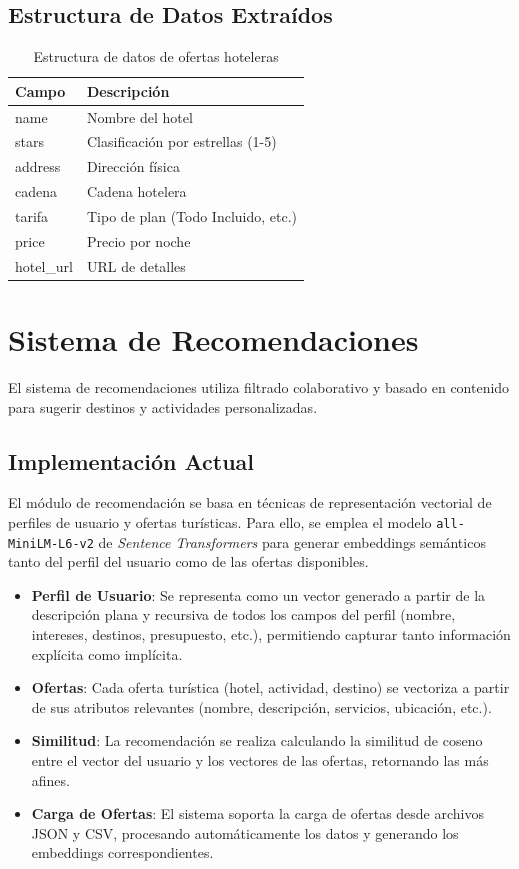 \documentclass[runningheads]{llncs}
\begin{document}
\subsection{Estructura de Datos Extraídos}

\begin{table}[H]
\centering
\begin{tabular}{ll}
\toprule
\textbf{Campo} & \textbf{Descripción} \\
\midrule
name & Nombre del hotel \\
stars & Clasificación por estrellas (1-5) \\
address & Dirección física \\
cadena & Cadena hotelera \\
tarifa & Tipo de plan (Todo Incluido, etc.) \\
price & Precio por noche \\
hotel\_url & URL de detalles \\
\bottomrule
\end{tabular}
\caption{Estructura de datos de ofertas hoteleras}
\end{table}

\section{Sistema de Recomendaciones}


El sistema de recomendaciones utiliza filtrado colaborativo y basado en contenido para sugerir destinos y actividades personalizadas.

\subsection{Implementación Actual}

El módulo de recomendación se basa en técnicas de representación vectorial de perfiles de usuario y ofertas turísticas. Para ello, se emplea el modelo \texttt{all-MiniLM-L6-v2} de \textit{Sentence Transformers} para generar embeddings semánticos tanto del perfil del usuario como de las ofertas disponibles.

\begin{itemize}
    \item \textbf{Perfil de Usuario}: Se representa como un vector generado a partir de la descripción plana y recursiva de todos los campos del perfil (nombre, intereses, destinos, presupuesto, etc.), permitiendo capturar tanto información explícita como implícita.
    \item \textbf{Ofertas}: Cada oferta turística (hotel, actividad, destino) se vectoriza a partir de sus atributos relevantes (nombre, descripción, servicios, ubicación, etc.).
    \item \textbf{Similitud}: La recomendación se realiza calculando la similitud de coseno entre el vector del usuario y los vectores de las ofertas, retornando las más afines.
    \item \textbf{Carga de Ofertas}: El sistema soporta la carga de ofertas desde archivos JSON y CSV, procesando automáticamente los datos y generando los embeddings correspondientes.
\end{itemize}
\end{document}
